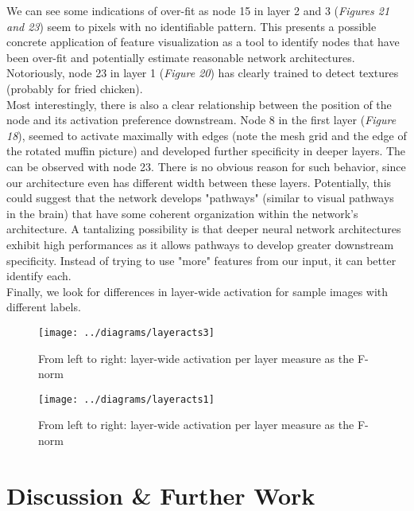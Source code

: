 \documentclass[12pt]{article}
\begin{document}
We can see some indications of over-fit as node 15 in layer 2 and 3 (\textit{Figures 21 and 23}) seem to pixels with no identifiable pattern. This presents a possible concrete application of feature visualization as a tool to identify nodes that have been over-fit and potentially estimate reasonable network architectures. \\

Notoriously, node 23 in layer 1 (\textit{Figure 20}) has clearly trained to detect textures (probably for fried chicken). \\

Most interestingly, there is also a clear relationship between the position of the node and its activation preference downstream. Node 8 in the first layer (\textit{Figure 18}), seemed to activate maximally with edges (note the mesh grid and the edge of the rotated muffin picture) and developed further specificity in deeper layers. The can be observed with node 23.  There is no obvious reason for such behavior, since our architecture even has different width between these layers. Potentially, this could suggest that the network develops "pathways" (similar to visual pathways in the brain) that have some coherent organization within the network's architecture. A tantalizing possibility is that deeper neural network architectures exhibit high performances as it allows pathways to develop greater downstream specificity. Instead of trying to use "more" features from our input, it can better identify each. \\

Finally, we look for differences in layer-wide activation for sample images with different labels.

\begin{figure}[H]
\centering
\texttt{[image: ../diagrams/layeracts3]}
\caption{From left to right: layer-wide activation per layer measure as the F-norm}
\label{fig:layeracts3}
\end{figure}
\begin{figure}[H]
\centering
\texttt{[image: ../diagrams/layeracts1]}
\caption{From left to right: layer-wide activation per layer measure as the F-norm}
\label{fig:layeracts1}
\end{figure}


\section{Discussion \& Further Work}
\end{document}

